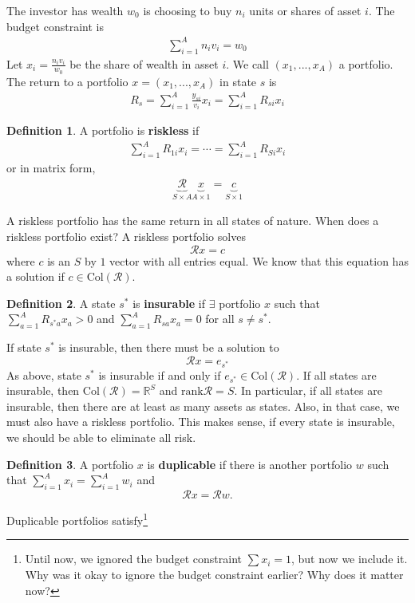 \documentclass[12pt,reqno]{amsart}
\theoremstyle{definition}
\newtheorem{definition}{Definition}[section]
\def\R{\mathbb{R}}
\newcommand{\rank}{\mathrm{rank}}
\newcommand{\col}{\mathrm{Col}}
\begin{document}
The investor has wealth $w_0$ is choosing to buy $n_{i}$ units or
shares of asset $i$. The budget constraint is
\begin{align}
  \sum_{i=1}^A n_i v_i = w_0
\end{align}
Let $x_i = \frac{n_i v_i}{w_0}$ be the share of wealth in asset
$i$. We call $(x_1, ..., x_A)$ a portfolio. 
The return to a portfolio $x = (x_1,...,x_A)$ in state $s$ is
\begin{align}
  R_s = \sum_{i=1}^A \frac{y_{si}}{v_i} x_i = \sum_{i=1}^A R_{si} x_i 
\end{align}
\begin{definition}
  A portfolio is \textbf{riskless} if 
  \begin{align*}
    \sum_{i=1}^A R_{1i} x_i  =  \cdots   =\sum_{i=1}^A R_{Si} x_i 
  \end{align*}
  or in matrix form,
  \begin{align*}
    \underbrace{\mathcal{R}}_{S \times A} \underbrace{x}_{A \times 1} =
    \underbrace{c}_{S \times 1}
  \end{align*}
\end{definition}
A riskless portfolio has the same return in all states of nature. When
does a riskless portfolio exist? A riskless portfolio solves
\[ \mathcal{R} x = c \] where $c$ is an $S$ by $1$ vector with all
entries equal. We know that this equation has a solution if $ c \in
\col(\mathcal{R})$. 
\begin{definition}
  A state $s^*$ is \textbf{insurable} if $\exists$ portfolio $x$ such
  that $\sum_{a=1}^A R_{s^*a} x_a > 0$ and $\sum_{a=1}^A R_{sa} x_a =
  0$ for all $s \neq s^*$. 
\end{definition}
If state $s^*$ is insurable, then there must be a solution to 
\[ \mathcal{R}x = e_{s^*} \] As above, state $s^*$ is insurable if and
only if $e_{s^*} \in \col(\mathcal{R})$. If all states are insurable,
then $\col(\mathcal{R}) = \R^S$ and $\rank \mathcal{R} = S$. In
particular, if all states are insurable, then there are at least as
many assets as states. Also, in that case, we must also have a
riskless portfolio. This makes sense, if every state is insurable, we
should be able to eliminate all risk. 
\begin{definition}
  A portfolio $x$ is \textbf{duplicable} if there is
  another portfolio $w$ such that $\sum_{i=1}^A x_i = \sum_{i=1}^A w_i
  $ and 
  \[ \mathcal{R} x = \mathcal{R} w. \]
\end{definition}
Duplicable portfolios satisfy\footnote{Until now, we ignored the
  budget constraint $\sum x_i = 1$, but now we include it. Why was it
  okay to ignore the budget constraint earlier? Why does it matter now?}
\end{document}
